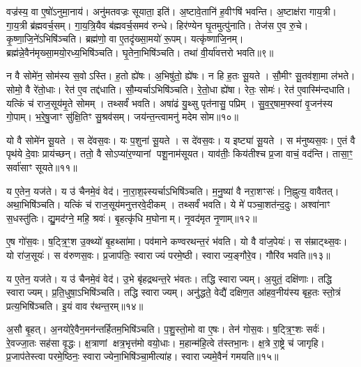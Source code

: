 वज्र॑स्य॒ वा ए॒षो॑\-ऽनुमा॒नाय॑।
अनु॑मतवज्रः सूयाता॒ इति॑।
अ॒ष्टावे॒तानि॑ ह॒वीꣳषि॑ भवन्ति।
अ॒ष्टाक्ष॑रा गाय॒त्री।
गा॒य॒त्री ब्र॑ह्मवर्च॒सम्।
गा॒य॒त्रि॒यैव ब॑ह्मवर्च॒समव॑ रुन्धे।
हिर॑ण्येन घृ॒तमुत्पु॑नाति।
तेज॑स ए॒व रु॒चे।
कृ॒ष्णा॒जि॒ने॑\-ऽभिषि॑ञ्चति।
ब्रह्म॑णो॒ वा ए॒तदृ॑ख्सा॒मयो॑ रू॒पम्।
यत्कृ॑ष्णाजि॒नम्।
ब्रह्म॑न्ने॒वैन॑मृख्सा॒मयो॒रध्य॒भिषि॑ञ्चति।
घृ॒तेना॒भिषि॑ञ्चति।
तथा॑ वी॒र्या॑वत्तरो भवति॥९॥\anuvakamend[स॒ङ्गच्छे॑ते भाग॒धेये॒नान्व॑मन्येताꣳ रू॒पं च॒त्वारि॑ च]

न वै सोमे॑न॒ सोम॑स्य स॒वो\-ऽस्ति।
ह॒तो ह्ये॑षः।
अ॒भिषु॑तो॒ ह्ये॑षः।
न हि ह॒तः सू॒यते।
सौ॒मीꣳ सू॒तव॑शा॒मा ल॑भते।
सोमो॒ वै रे॑तो॒धाः।
रेत॑ ए॒व तद्द॑धाति।
सौ॒म्यर्चा\-ऽभिषि॑ञ्चति।
रे॒तो॒धा ह्ये॑षा।
रेतः॒ सोमः॑।
रेत॑ ए॒वास्मि॑न्दधाति।
यत्किं च॑ राज॒सूय॑मृ॒ते सोमम्।
तथ्सर्वं॑ भवति।
अषा॑ढं यु॒थ्सु पृत॑नासु॒ पप्रिम्।
सु॒व॒र्॒षाम॒फ्स्वां वृ॒जन॑स्य गो॒पाम्।
भ॒रे॒षु॒जाꣳ सु॑क्षि॒तिꣳ सु॒श्रव॑सम्।
जय॑न्त॒न्त्वामनु॑ मदेम सोम॥१०॥\anuvakamend[रेतः॒ सोमः॑ स॒प्त च॑]

यो वै सोमे॑न सू॒यते।
स दे॑वस॒वः।
यः प॒शुना॑ सू॒यते।
स दे॑वस॒वः।
य इष्ट्या॑ सू॒यते।
स म॑नुष्यस॒वः।
ए॒तं वै पृथ॑ये दे॒वाः प्राय॑च्छन्।
ततो॒ वै सोऽप्या॑र॒ण्यानां पशू॒नाम॑सूयत।
याव॑तीः॒ किय॑तीश्च प्र॒जा वाचं॒ वद॑न्ति।
तासा॒ꣳ॒ सर्वा॑साꣳ सूयते॥११॥

य ए॒तेन॒ यज॑ते।
य उ॑ चैनमे॒वं वेद॑।
ना॒रा॒श॒ꣴस्यर्चा\-ऽभिषि॑ञ्चति।
म॒नु॒ष्या॑ वै नरा॒शꣳसः॑।
नि॒ह्नुत्य॒ वावैतत्।
अथा॒भिषि॑ञ्चति।
यत्किं च॑ राज॒सूय॑मनुत्तरवे॒दीकम्।
तथ्सर्वं॑ भवति।
ये मे॑ पञ्चा॒शत॑न्द॒दुः।
अश्वा॑नाꣳ स॒धस्तु॑तिः।
द्यु॒मद॑ग्ने॒ महि॒ श्रवः॑।
बृ॒हत्कृ॑धि म॒घोनाम्।
नृ॒वद॑मृत नृ॒णाम्॥१२॥\anuvakamend[सू॒य॒ते॒ स॒धस्तु॑ति॒स्त्रीणि॑ च]

ए॒ष गो॑स॒वः।
ष॒ट्त्रि॒ꣳ॒श उ॒क्थ्यो॑ बृ॒हथ्सा॑मा।
पव॑माने कण्वरथन्त॒रं भ॑वति।
यो वै वा॑ज॒पेयः॑।
स स॑म्राट्थ्स॒वः।
यो रा॑ज॒सूयः॑।
स व॑रुणस॒वः।
प्र॒जाप॑तिः॒ स्वाराज्यं परमे॒ष्ठी।
स्वाराज्य॒ङ्गौरे॒व।
गौरि॑व भवति॥१३॥

य ए॒तेन॒ यज॑ते।
य उ॑ चैनमे॒वं वेद॑।
उ॒भे बृ॑हद्रथन्त॒रे भ॑वतः।
तद्धि स्वाराज्यम्।
अ॒युतं॒ दक्षि॑णाः।
तद्धि स्वाराज्यम्।
प्र॒ति॒धुषा॒\-ऽभिषि॑ञ्चति।
तद्धि स्वाराज्यम्।
अनु॑द्धते॒ वेद्यै॑ दक्षिण॒त आ॑हव॒नीय॑स्य बृह॒तः स्तो॒त्रं प्रत्य॒भिषि॑ञ्चति।
इ॒यं वाव र॑थन्त॒रम्॥१४॥

अ॒सौ बृ॒हत्।
अ॒नयो॑रे॒वैन॒मन॑न्तर्\mbox{}हितम॒भिषि॑ञ्चति।
प॒शु॒स्तो॒मो वा ए॒षः।
तेन॑ गोस॒वः।
ष॒ट्त्रि॒ꣳ॒शः सर्वः॑।
रे॒वज्जा॒तः सह॑सा वृ॒द्धः।
क्ष॒त्राणां क्षत्र॒भृत्त॑मो वयो॒धाः।
म॒हान्म॑हि॒त्वे त॑स्तभा॒नः।
क्ष॒त्रे रा॒ष्ट्रे च॑ जागृहि।
प्र॒जाप॑तेस्त्वा परमे॒ष्ठिनः॒ स्वाराज्येना॒भिषि॑ञ्चा॒मीत्या॑ह।
स्वाराज्यमे॒वैनं॑ गमयति॥१५॥\anuvakamend[इ॒व॒ भ॒व॒ति॒ र॒थ॒न्त॒रमा॒हैकं॑ च]

